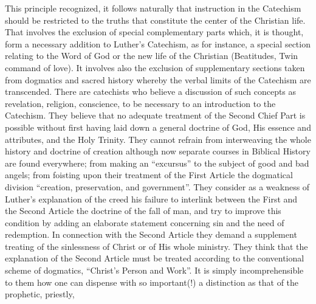 This principle recognized, it follows naturally that instruction in the Catechism should be restricted to the truths that constitute the center of the Christian life. That involves the exclusion of special complementary parts which, it is thought, form a necessary addition to Luther’s Catechism, as for instance, a special section relating to the Word of God or the new life of the Christian (Beatitudes, Twin command of love). It involves also the exclusion of supplementary sections taken from dogmatics and sacred history whereby the verbal limits of the Catechism are transcended. There are catechists who believe a discussion of such concepts as revelation, religion, conscience, to be necessary to an introduction to the Catechism. They believe that no adequate treatment of the Second Chief Part is possible without first having laid down a general doctrine of God, His essence and attributes, and the Holy Trinity. They cannot refrain from interweaving the whole history and doctrine of creation although now separate courses in Biblical History are found everywhere; from making an “excursus” to the subject of good and bad angels; from foisting upon their treatment of the First Article the dogmatical division “creation, preservation, and government”. They consider as a weakness of Luther’s explanation of the creed his failure to interlink between the First and the Second Article the doctrine of the fall of man, and try to improve this condition by adding an elaborate statement concerning sin and the need of redemption. In connection with the Second Article they demand a supplement treating of the sinlessness of Christ or of His whole ministry. They think that the explanation of the Second Article must be treated according to the conventional scheme of dogmatics, “Christ’s Person and Work”. It is simply incomprehensible to them how one can dispense with so important(!) a distinction as that of the prophetic, priestly,
